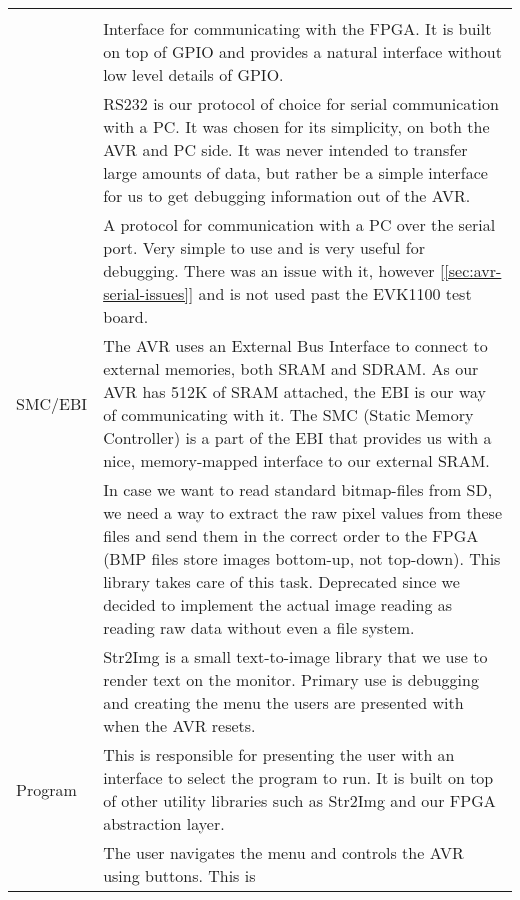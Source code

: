 \begin{table}[htbp]
\begin{tabular}{l|p{10cm}}
\begin{comment}
	GPIO, and provide a more natural interface for us to use. \\
\end{comment}
	FPGA/GPIO & Interface for communicating with the FPGA. It is built on top of GPIO
	and provides a natural interface without low level details of GPIO. \\
	\hline
\begin{comment}
	RS232 & RS232 is our protocol of choice for serial communication with a PC. It
	was chosen for its simplicity, on both the AVR and PC side. It was never
	intended to transfer large amounts of data, but rather be a simple
	interface for us to get debugging information out of the AVR. \\
\end{comment}
	RS232 & A protocol for communication with a PC over the serial port. Very simple to
	use and is very useful for debugging. There was an issue with it, however [\ref{sec:avr-serial-issues}]
	and is not used past the EVK1100 test board. \\
	\hline
	SMC/EBI & The AVR uses an External Bus Interface to connect to external memories,
	both SRAM and SDRAM. As our AVR has 512K of SRAM attached, the EBI is
	our way of communicating with it.
	The SMC (Static Memory Controller) is a part of the EBI that provides us
	with a nice, memory-mapped interface to our external SRAM. \\
	\hline
\begin{comment}
	BMP & In case we want to read standard bitmap-files from SD, we need a way to
	extract the raw pixel values from these files and send them in the
	correct order to the FPGA (BMP files store images bottom-up, not
	top-down). This library takes care of this task. Deprecated since we
	decided to implement the actual image reading as reading raw data without
	even a file system. \\
	\hline
\end{comment}
	Str2Img & Str2Img is a small text-to-image library that we use to render text on
	the monitor. Primary use is debugging and creating the menu the users are presented
	with when the AVR resets. \\
	\hline
	Program & This is responsible for presenting the user with an
	interface to select the program to run. It is built on top of other
	utility libraries such as Str2Img and our FPGA abstraction layer. \\
	\hline
\begin{comment}
	\hline
	Button & The user navigates the menu and controls the AVR using buttons. This is

\end{comment}
\end{tabular}
\end{table}

